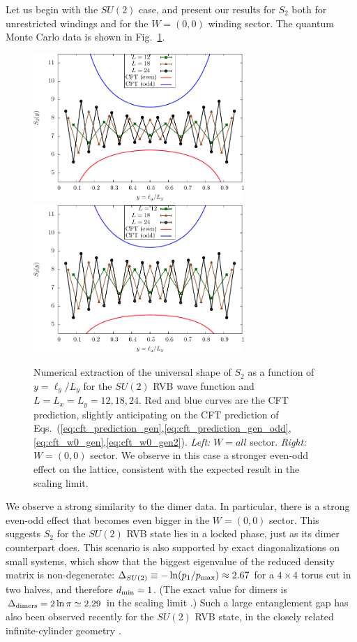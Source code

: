 \documentclass[11pt]{iopart}
\begin{document}
Let us begin with the $SU(2)$ case, and present our results for $S_2$ both for unrestricted windings and for the $W=(0,0)$ winding sector. The quantum Monte Carlo data is shown in Fig.~\ref{fig:SU2_shape}.\begin{figure}[ht]
 \begin{center}
  \includegraphics[width=8cm]{./figures/SU2_shape.pdf}
  \includegraphics[width=8cm]{./figures/SU2_shape_w0.pdf}
 \end{center}
\caption{Numerical extraction of the universal shape of $S_2$ as a function of $y=\ell_y/L_y$ for the $SU(2)$ RVB wave function and $L=L_x=L_y=12,18,24$. Red and blue curves are the CFT prediction, slightly anticipating on the CFT prediction of Eqs.~(\ref{eq:cft_prediction_gen},\ref{eq:cft_prediction_gen_odd},\ref{eq:cft_w0_gen},\ref{eq:cft_w0_gen2}). \emph{Left:} $W=all$ sector.  \emph{Right:} $W=(0,0)$ sector. We observe in this case a stronger even-odd effect on the lattice, consistent with the expected result in the scaling limit.}
\label{fig:SU2_shape}
\end{figure}
We observe a strong similarity to the dimer data. In particular, there is a strong even-odd effect that becomes even bigger in the $W=(0,0)$ sector.
This suggests $S_2$ for the $SU(2)$ RVB state lies in a locked phase, just as its dimer counterpart does. 
This scenario is also supported by exact diagonalizations on small systems, which show that the biggest eigenvalue of the reduced density matrix is non-degenerate:  $\Delta_{SU(2)}\equiv -\ln (p_1/p_{\rm max}) \approx 2.67$ for a $4\times 4$ torus cut in two halves, and therefore $d_{\rm min}=1$. (The exact value for dimers is $\Delta_{\rm dimers}=2\ln \pi\simeq 2.29$ in the scaling limit \cite{Stephan2012}.) Such a large entanglement gap has also been observed recently for the $SU(2)$ RVB state, in the closely related infinite-cylinder geometry \cite{Poilblanc}.
\end{document}
